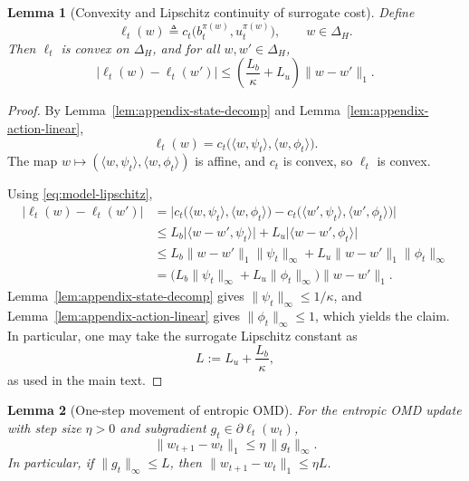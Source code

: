 \documentclass[11pt]{article}
\newtheorem{lemma}{Lemma}
\begin{document}
\begin{lemma}[Convexity and Lipschitz continuity of surrogate cost]
\label{lem:appendix-surrogate}
Define
\[
\ell_t(w) \triangleq c_t\bigl(b_t^{\pi(w)},u_t^{\pi(w)}\bigr), \qquad w\in\Delta_H.
\]
Then $\ell_t$ is convex on $\Delta_H$, and for all $w,w'\in\Delta_H$,
\[
|\ell_t(w)-\ell_t(w')|
\le
\left(\frac{L_b}{\kappa}+L_u\right)\|w-w'\|_1.
\]
\end{lemma}

\begin{proof}
By Lemma~\ref{lem:appendix-state-decomp} and Lemma~\ref{lem:appendix-action-linear},
\[
\ell_t(w)=c_t\bigl(\langle w,\psi_t\rangle,\langle w,\phi_t\rangle\bigr).
\]
The map $w\mapsto (\langle w,\psi_t\rangle,\langle w,\phi_t\rangle)$ is affine, and $c_t$ is convex, so $\ell_t$ is convex.

Using \eqref{eq:model-lipschitz},
\begin{align*}
|\ell_t(w)-\ell_t(w')|
&= \bigl|c_t\bigl(\langle w,\psi_t\rangle,\langle w,\phi_t\rangle\bigr)-c_t\bigl(\langle w',\psi_t\rangle,\langle w',\phi_t\rangle\bigr)\bigr| \\
&\le L_b\bigl|\langle w-w',\psi_t\rangle\bigr| + L_u\bigl|\langle w-w',\phi_t\rangle\bigr| \\
&\le L_b\|w-w'\|_1\|\psi_t\|_\infty + L_u\|w-w'\|_1\|\phi_t\|_\infty \\
&= \bigl(L_b\|\psi_t\|_\infty + L_u\|\phi_t\|_\infty\bigr)\|w-w'\|_1.
\end{align*}
Lemma~\ref{lem:appendix-state-decomp} gives $\|\psi_t\|_\infty\le 1/\kappa$, and Lemma~\ref{lem:appendix-action-linear} gives $\|\phi_t\|_\infty\le 1$, which yields the claim. In particular, one may take the surrogate Lipschitz constant as
\[
L := L_u + \frac{L_b}{\kappa},
\]
as used in the main text.
\end{proof}

\begin{lemma}[One-step movement of entropic OMD]
\label{lem:omd-move}
For the entropic OMD update with step size \(\eta>0\) and subgradient \(g_t\in\partial \ell_t(w_t)\),
\[
\|w_{t+1}-w_t\|_1 \le \eta\,\|g_t\|_\infty.
\]
In particular, if \(\|g_t\|_\infty\le L\), then \(\|w_{t+1}-w_t\|_1\le \eta L\).
\end{lemma}
\end{document}
